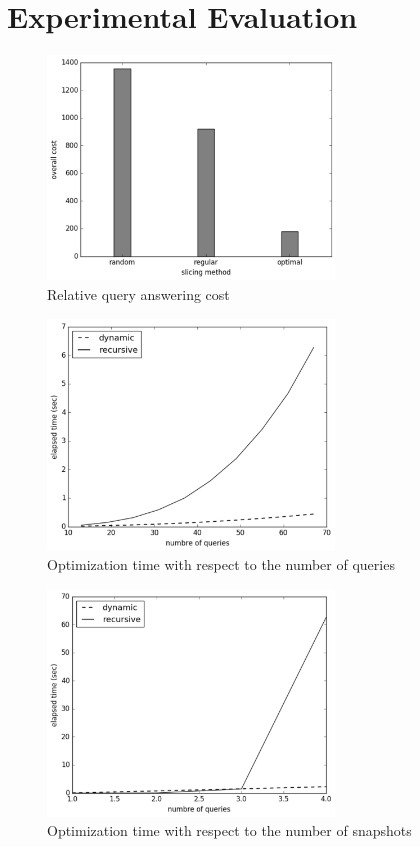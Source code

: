 \section{Experimental Evaluation}

\begin{figure}[tb]
    \includegraphics[width=3in]{figs/cuts_cost.pdf}
    \caption{Relative query answering cost}
\end{figure}

\begin{figure}[tb]
    \includegraphics[width=3in]{figs/multiquery_runtime.pdf}
    \caption{Optimization time with respect to the number of queries}
\end{figure}

\begin{figure}[tb]
    \includegraphics[width=3in]{figs/multisnap_runtime.pdf}
    \caption{Optimization time with respect to the number of snapshots}
\end{figure}

